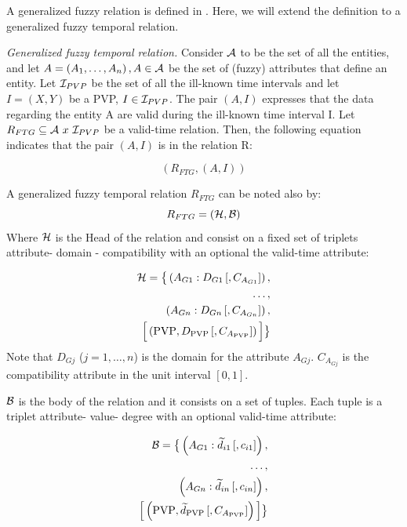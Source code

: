 A generalized fuzzy relation is defined in \cite{Medina1994}. Here, we will extend the definition to a generalized fuzzy temporal relation.

\begin{definition}
\emph{Generalized fuzzy temporal relation.}
Consider $\mathcal{A}$ to be the set of all the entities, and let $A=\left(A_1, \ldots, A_n \right), A \in \mathcal{A}$ be the set of (fuzzy) attributes that define an entity. Let $\mathcal{I}_{PVP}$ be the set of all the ill-known time intervals and let $I = \left(X, Y \right)$ be a PVP, $I \in \mathcal{I}_{PVP}$.  The pair $\left(A, I\right)$ expresses that the data regarding the entity A are valid during the ill-known time interval I. Let $R_{FTG} \subseteq \mathcal{A} \  x\  \mathcal{I}_{PVP}$ be a valid-time relation. Then, the following equation indicates that the pair $\left(A, I\right)$ is in the relation R:

\begin{equation}
\label{eq:fuzzy-rel-def}
\left( R_{FTG}, \left(A , I\right) \right)
\end{equation}

A generalized fuzzy temporal relation $R_{FTG}$ can be noted also by:
\label{def:generalized-fuzzy-temporal-relation}
\begin{equation}
\label{eq:generalized-fuzzy-temporal-relation}
R_{FTG} = \left(\mathcal{H}, \mathcal{B} \right)
\end{equation}
Where $\mathcal{H}$ is the Head of the relation and consist on a fixed set of triplets attribute- domain - compatibility with an optional the valid-time attribute:

\begin{align}
\label{eq:head-valid-time}
\mathcal{H} = \big \lbrace \left(A_{G1}:D_{G1}\left[,C_{A_{G1}} \right] \right),\\
\nonumber
 \ldots,\\
 \nonumber
  \left(A_{Gn}:D_{Gn}\left[,C_{A_{Gn}} \right] \right),\\
  \nonumber
  \Big[  \left( \text{PVP}, D_{\text{PVP}}\left[,C_{A_{\text{PVP}}} \right] \right) \Big] \big \rbrace
\end{align}
Note that $D_{Gj}$ ($j = 1, \ldots, n$) is the domain for the attribute $A_{Gj}$. $C_{A_{Gj}}$ is the compatibility attribute in the unit interval $\left[0, 1 \right]$.

$\mathcal{B}$ is the body of the relation and it consists on a set of tuples. Each tuple is a triplet attribute- value- degree with an optional valid-time attribute:

\begin{align}
\label{eq:body-valid-time}
\mathcal{B} = \big \lbrace \left(A_{G1}:\widetilde{d}_{i1}\left[,c_{i1} \right] \right),\\
\nonumber
 \ldots,\\
 \nonumber
  \left(A_{Gn}:\widetilde{d}_{in}\left[,c_{in} \right] \right),\\
  \nonumber
   \Big[  \left( \text{PVP}, \widetilde{d}_{\text{PVP}} \left[,C_{A_{\text{PVP}}} \right] \right)  \Big] \big \rbrace
\end{align}

\end{definition}


